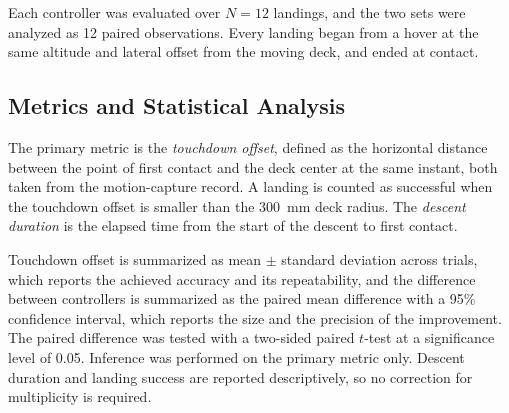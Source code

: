 Each controller was evaluated over $N = 12$ landings, and the two sets were analyzed as 12
paired observations. Every landing began from a hover at the same altitude and lateral
offset from the moving deck, and ended at contact.


\subsection{Metrics and Statistical Analysis}

The primary metric is the \emph{touchdown offset}, defined as the horizontal distance
between the point of first contact and the deck center at the same instant, both taken
from the motion-capture record. A landing is counted as successful when the touchdown
offset is smaller than the 300~mm deck radius. The \emph{descent duration} is the elapsed
time from the start of the descent to first contact.

Touchdown offset is summarized as mean $\pm$ standard deviation across trials, which
reports the achieved accuracy and its repeatability, and the difference between
controllers is summarized as the paired mean difference with a 95\% confidence interval,
which reports the size and the precision of the improvement. The paired difference was
tested with a two-sided paired $t$-test at a significance level of 0.05. Inference was
performed on the primary metric only. Descent duration and landing success are reported
descriptively, so no correction for multiplicity is required.

